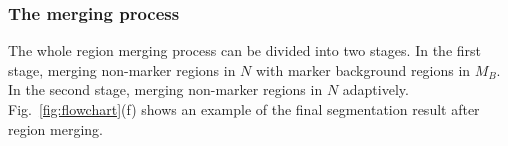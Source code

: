 \documentclass[conference]{IEEEtran}
\begin{document}
\subsubsection{The merging process}

The whole region merging process can be divided into two stages. In the first stage, merging non-marker regions in $N$ with marker background regions in $M_B$. In the second stage, merging non-marker regions in $N$ adaptively. Fig.~\ref{fig:flowchart}(f) shows an example of the final segmentation result after region merging.





%
%



%
%
\end{document}
